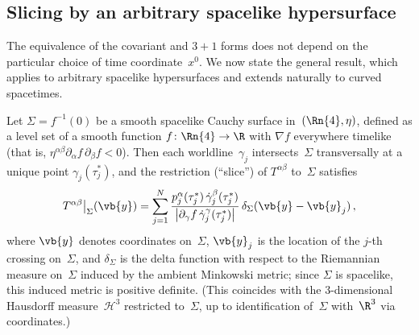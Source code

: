 \subsection{Slicing by an arbitrary spacelike hypersurface}%
\label{sec:general-slicing}

The equivalence of the covariant and $3{+}1$ forms does not depend
on the particular choice of time coordinate~$x^0$.  We now state
the general result, which applies to arbitrary spacelike
hypersurfaces and extends naturally to curved spacetimes.

\begin{theorem}%
\label{thm:general-slicing}
  Let $\Sigma = f^{-1}(0)$ be a smooth spacelike Cauchy surface
  in~$(\Rn{4},\eta)$, defined as a level set of a smooth function
  $f\colon\Rn{4}\to\R$ with $\nabla f$ everywhere timelike
  (that is, $\eta^{\alpha\beta}\partial_\alpha f\,\partial_\beta f < 0$).
  Then each worldline~$\gamma_j$ intersects~$\Sigma$
  transversally at a unique point
  $\gamma_j(\tau_j^\ast)$, and the restriction (``slice'') of
  $T^{\alpha\beta}$ to~$\Sigma$ satisfies
  \begin{equation}\label{eq:general-slicing}
    T^{\alpha\beta}\big|_\Sigma(\vb{y})
      = \sum_{j=1}^{N}
        \frac{p_j^\alpha(\tau_j^\ast)\,
              \dot\gamma_j^\beta(\tau_j^\ast)}
             {\bigl|\partial_\gamma f\,
              \dot\gamma_j^\gamma(\tau_j^\ast)\bigr|}\,
        \delta_\Sigma(\vb{y} - \vb{y}_j)\,,
  \end{equation}
  where $\vb{y}$ denotes coordinates on~$\Sigma$, $\vb{y}_j$ is
  the location of the $j$-th crossing on~$\Sigma$, and
  $\delta_\Sigma$ is the delta function with respect to the
  Riemannian measure on~$\Sigma$ induced by the ambient Minkowski
  metric; since $\Sigma$ is spacelike, this induced metric is
  positive definite.  (This coincides with the $3$-dimensional
  Hausdorff measure~$\mathcal{H}^3$ restricted to~$\Sigma$, up
  to identification of~$\Sigma$ with~$\R^3$ via coordinates.)
\end{theorem}

